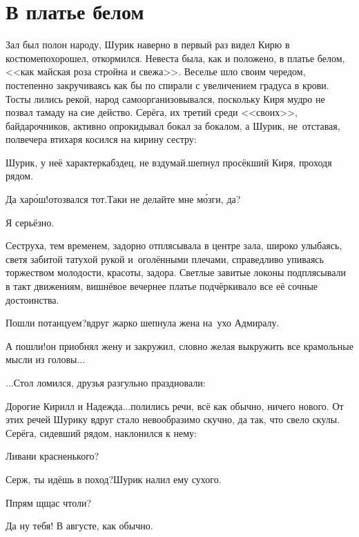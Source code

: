 {
\chapter{В платье белом}
\vepsianrose

\fancyhead[LE]{\fancyplain{}{\bfseries \parttitle}}
\fancyhead[RO]{\fancyplain{}{\bfseries \rightmark}}

Зал был полон народу, Шурик наверно в первый раз видел Кирю в костюме\mdash похорошел, откормился. Невеста была, как и положено, в платье белом, <<как майская роза стройна и свежа>>. Веселье шло своим чередом, постепенно закручиваясь как бы по спирали с увеличением градуса в крови. Тосты лились рекой, народ самоорганизовывался, поскольку Киря мудро не позвал тамаду на сие действо. Серёга, их третий среди <<своих>>, байдарочников, активно опрокидывал бокал за бокалом, а Шурик, не~отставая, полвечера втихаря косился на кирину сестру:

\diagdash Шурик, у неё характер\mdash кабздец, не вздумай.\mdash шепнул просёкший Киря, проходя рядом. 

\diagdash Да хар\'{о}ш!\mdash отозвался тот.\mdash Таки не делайте мне м\'{о}зги, да?

\diagdash Я серьёзно.

Сеструха, тем временем, задорно отплясывала в центре зала, широко улыбаясь, светя забитой татухой рукой и~оголёнными плечами, справедливо упиваясь торжеством молодости, красоты, задора. Светлые завитые локоны подплясывали в такт движениям, вишнёвое вечернее платье подчёркивало все её сочные достоинства.

\diagdash Пошли потанцуем?\mdash вдруг жарко шепнула жена на~ухо Адмиралу.

\diagdash А пошли!\mdash он приобнял жену и закружил, словно желая выкружить все крамольные мысли из головы$\ldots$

$\ldots$Стол ломился, друзья разгульно праздновали:

\diagdash Дорогие Кирилл и Надежда$\ldots$\mdash полились речи, всё как обычно, ничего нового. От этих речей Шурику вдруг стало невообразимо скучно, да так, что свело скулы. Серёга, сидевший рядом, наклонился к нему:

\diagdash Ливани красненького?

\diagdash Серж, ты идёшь в поход?\mdash Шурик налил ему сухого. 

\diagdash П\sdash прям щ\sdash щас чтоли?

\diagdash Да ну тебя! В августе, как обычно.

}
